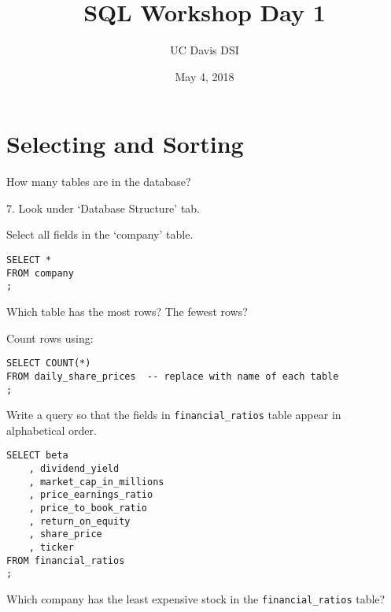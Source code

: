 \documentclass[10pt]{exam}
\begin{document}
 
\title{SQL Workshop Day 1}
\author{UC Davis DSI}
\date{May 4, 2018}

\maketitle

\section{Selecting and Sorting}

\begin{questions}

\question How many tables are in the database?

\begin{solution}
    7. Look under `Database Structure' tab.
\end{solution}


\question Select all fields in the `company' table.

\begin{solution}
\begin{lstlisting}
SELECT *
FROM company
;
\end{lstlisting}
\end{solution}


\question Which table has the most rows? The fewest rows?

\begin{solution}

    Count rows using:

\begin{lstlisting}
SELECT COUNT(*)
FROM daily_share_prices  -- replace with name of each table
;
\end{lstlisting}
\end{solution}


\question Write a query so that the fields in \texttt{financial\_ratios} table
appear in alphabetical order.

\begin{solution}
\begin{lstlisting}
SELECT beta
    , dividend_yield
    , market_cap_in_millions
    , price_earnings_ratio
    , price_to_book_ratio
    , return_on_equity
    , share_price
    , ticker
FROM financial_ratios
;
\end{lstlisting}
\end{solution}


    \question Which company has the least expensive stock in the
    \texttt{financial\_ratios} table?


\end{questions}
\end{document}
